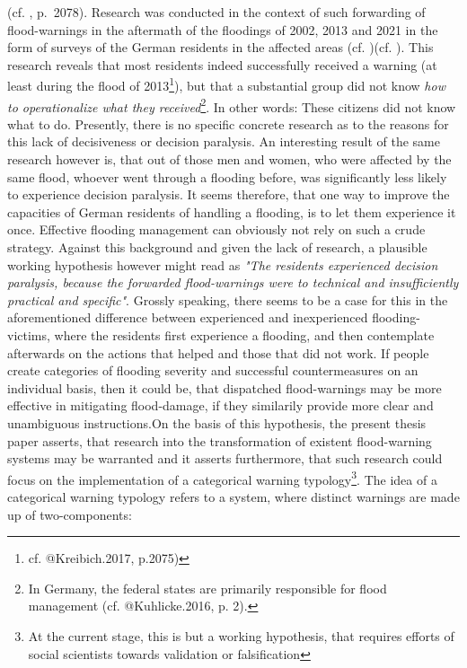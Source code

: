 \documentclass[
  12pt,
]{article}
\begin{document}
(cf. \citet{Kreibich.2017}, p.~2078). Research was conducted in the
context of such forwarding of flood-warnings in the aftermath of the
floodings of 2002, 2013 and 2021 in the form of surveys of the German
residents in the affected areas (cf. \citet{Kreibich.2017})(cf.
\citet{Thieken.2022}). This research reveals that most residents indeed
successfully received a warning (at least during the flood of
2013\footnote{cf. @Kreibich.2017, p.2075)}), but that a substantial
group did not know
\textit{how to operationalize what they received}\footnote{In Germany, the federal states are primarily responsible for flood management (cf. @Kuhlicke.2016, p. 2).}.
In other words: These citizens did not know what to do. Presently, there
is no specific concrete research as to the reasons for this lack of
decisiveness or decision paralysis. An interesting result of the same
research however is, that out of those men and women, who were affected
by the same flood, whoever went through a flooding before, was
significantly less likely to experience decision paralysis. It seems
therefore, that one way to improve the capacities of German residents of
handling a flooding, is to let them experience it once.\newline
Effective flooding management can obviously not rely on such a crude
strategy. Against this background and given the lack of research, a
plausible working hypothesis however might read as
\textit{"The residents experienced decision paralysis, because the forwarded flood-warnings were to technical and insufficiently practical and specific"}.
Grossly speaking, there seems to be a case for this in the
aforementioned difference between experienced and inexperienced
flooding-victims, where the residents first experience a flooding, and
then contemplate afterwards on the actions that helped and those that
did not work. If people create categories of flooding severity and
successful countermeasures on an individual basis, then it could be,
that dispatched flood-warnings may be more effective in mitigating
flood-damage, if they similarily provide more clear and unambiguous
instructions.\newline On the basis of this hypothesis, the present
thesis paper asserts, that research into the transformation of existent
flood-warning systems may be warranted and it asserts furthermore, that
such research could focus on the implementation of a categorical warning
typology\footnote{At the current stage, this is but a working hypothesis, that requires efforts of social scientists towards validation or falsification}.\newline
The idea of a categorical warning typology refers to a system, where
distinct warnings are made up of two-components:
\end{document}
